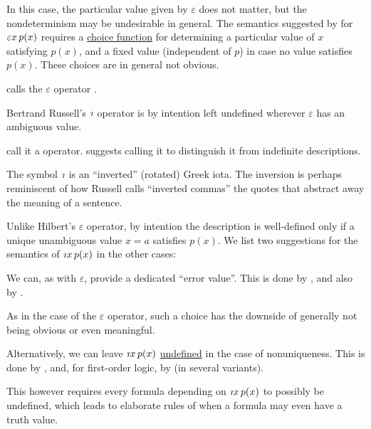 \begin{concept}
\begin{thmenum}
    In this case, the particular value given by \( \varepsilon \) does not matter, but the nondeterminism may be undesirable in general. The semantics suggested by  for \( \quantifier \varepsilon x p(x) \) requires a \hyperref[def:choice_function]{choice function} for determining a particular value of \( x \) satisfying \( p(x) \), and a fixed value (independent of \( p \)) in case no value satisfies \( p(x) \). These choices are in general not obvious.

     calls the \( \varepsilon \) operator .

     Bertrand Russell's \( \rotiota \) operator is by intention left undefined wherever \( \varepsilon \) has an ambiguous value.

     call it a  operator.  suggests calling it  to distinguish it from indefinite descriptions.

    The symbol \( \rotiota \) is an \enquote{inverted} (rotated) Greek iota. The inversion is perhaps reminiscent of how Russell calls \enquote{inverted commas} the quotes that abstract away the meaning of a sentence.

    Unlike Hilbert's \( \varepsilon \) operator, by intention the description is well-defined only if a unique unambiguous value \( x = a \) satisfies \( p(x) \). We list two suggestions for the semantics of  \( \quantifier \rotiota x p(x) \) in the other cases:
    \begin{thmenum}
       We can, as with \( \varepsilon \), provide a dedicated \enquote{error value}. This is done by , and also by .

      As in the case of the \( \varepsilon \) operator, such a choice has the downside of generally not being obvious or even meaningful.

       Alternatively, we can leave \( \quantifier \rotiota x p(x) \) \hyperref[con:undefinedness]{undefined} in the case of nonuniqueness. This is done by , and, for first-order logic, by  (in several variants).

      This however requires every formula depending on \( \quantifier \rotiota x p(x) \) to possibly be undefined, which leads to elaborate rules of when a formula may even have a truth value.
    \end{thmenum}


\end{thmenum}
\end{concept}

